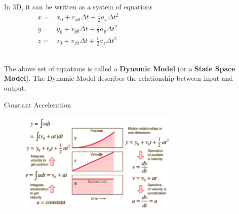 \begin{frame}
\begin{columns}
    In 3D, it can be written as a system of equations
    \begin{align*}
     x = & x_0 + v_{x0} \Delta t + \frac{1}{2}a_x\Delta t^2\\\nonumber
     y = & y_0 + v_{y0} \Delta t + \frac{1}{2}a_y\Delta t^2\\\nonumber
     z = & z_0 + v_{z0} \Delta t + \frac{1}{2}a_z\Delta t^2\\\nonumber
    \end{align*}
    \end{columns}
   The above set of equations is called a \textbf{Dynamic Model} (or a \textbf{State Space Model}). The Dynamic Model describes the relationship between input and output.
\end{frame}

\begin{frame}{Constant Acceleration}
    \begin{figure}
		\centering
			\includegraphics[width=0.7\textwidth]{Figures/Background/Constant Acceleration.png}
		\label{fig:Radar_Tracking}
	\end{figure}     
    
\end{frame}

